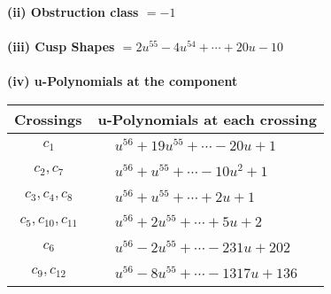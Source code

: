 \documentclass[1p]{elsarticle_modified}
\theoremstyle{definition}
\begin{document}
\flushleft \textbf{(ii) Obstruction class $= -1$}\\~\\
\flushleft \textbf{(iii) Cusp Shapes $= 2 u^{55}-4 u^{54}+\cdots+20 u-10$}\\~\\
\newpage\renewcommand{\arraystretch}{1}
\flushleft \textbf{(iv) u-Polynomials at the component}\newline \\
\begin{tabular}{m{50pt}|m{274pt}}
Crossings & \hspace{64pt}u-Polynomials at each crossing \\
\hline $$\begin{aligned}c_{1}\end{aligned}$$&$\begin{aligned}
&u^{56}+19 u^{55}+\cdots-20 u+1
\end{aligned}$\\
\hline $$\begin{aligned}c_{2},c_{7}\end{aligned}$$&$\begin{aligned}
&u^{56}+u^{55}+\cdots-10 u^2+1
\end{aligned}$\\
\hline $$\begin{aligned}c_{3},c_{4},c_{8}\end{aligned}$$&$\begin{aligned}
&u^{56}+u^{55}+\cdots+2 u+1
\end{aligned}$\\
\hline $$\begin{aligned}c_{5},c_{10},c_{11}\end{aligned}$$&$\begin{aligned}
&u^{56}+2 u^{55}+\cdots+5 u+2
\end{aligned}$\\
\hline $$\begin{aligned}c_{6}\end{aligned}$$&$\begin{aligned}
&u^{56}-2 u^{55}+\cdots-231 u+202
\end{aligned}$\\
\hline $$\begin{aligned}c_{9},c_{12}\end{aligned}$$&$\begin{aligned}
&u^{56}-8 u^{55}+\cdots-1317 u+136
\end{aligned}$\\
\hline
\end{tabular}\\~\\
\end{document}
